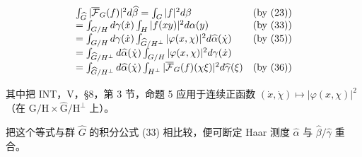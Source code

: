 \[
\begin{array}{l l} \int_ {\widehat {G}} | \overline {{\mathcal {F}}} _ {G} (f) | ^ {2} d \widehat {\beta} = \int_ {G} | f | ^ {2} d \beta & (\text {by (23)}) \\ = \int_ {G / H} d \gamma (\dot {x}) \int_ {H} | f (x y) | ^ {2} d \alpha (y) & (\text {by (33)}) \\ = \int_ {G / H} d \gamma (\dot {x}) \int_ {\widehat {G} / H ^ {\perp}} | \varphi (x, \chi) | ^ {2} d \widehat {\alpha} (\dot {\chi}) & (\text {by (35)}) \\ = \int_ {\widehat {G} / H ^ {\perp}} d \widehat {\alpha} (\dot {\chi}) \int_ {G / H} | \varphi (x, \chi) | ^ {2} d \gamma (\dot {x}) \\ = \int_ {\widehat {G} / H ^ {\perp}} d \widehat {\alpha} (\dot {\chi}) \int_ {H ^ {\perp}} | \overline {{\mathcal {F}}} _ {G} (f) (\chi \xi) | ^ {2} d \widehat {\gamma} (\xi) & (\text {by (36)}) \end{array}
\]

其中把 INT，V，§8，第 3 节，命题 5 应用于连续正函数 \((\dot{x},\dot{\chi})\mapsto |\varphi (x,\chi)|^{2}\)（在 \(\mathrm{G / H}\times \widehat{\mathrm{G}} /\mathrm{H}^{\perp}\) 上）。

把这个等式与群 \(\widehat{G}\) 的积分公式 (33) 相比较，便可断定 Haar 测度 \(\widehat{\alpha}\) 与 \(\widehat{\beta}/\widehat{\gamma}\) 重合。


